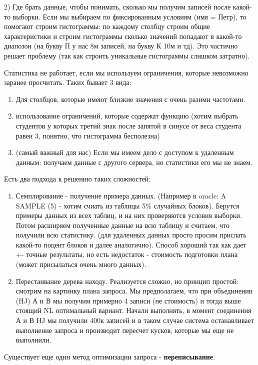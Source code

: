 2) Где брать данные, чтобы понимать, сколько мы получим записей после какой-то выборки. Если мы выбираем по фиксированным условиям (имя = Петр), то помогают строим гистограммы: по каждому столбцу строим общие характеристики и строим гистограммы сколько значений попадают в какой-то диапозон (на букву П у нас 8м записей, на букву К 10м и тд). Это частично решает проблему (так как строить уникальные гистограммы слишком затратно). 

Статистика не работает, если мы используем ограничения, которые невозможно заранее просчитать. Таких бывает 3 вида: 
\begin{enumerate}
	\item Для столбцов, которые имеют близкие значения с очень разнми частотами.
	\item использование ограничений, которые содержат функцию (хотим выбрать студентов у которых третий знак после запятой в синусе от веса студента равен 3, понятно, что гистограмма бесполезна) 
	\item (самый важный для нас) Если мы имеем дело с доступом к удаленным данным: получаем данные с другого сервера, но статистики его мы не знаем.
\end{enumerate}

Есть два подхода к решению таких сложностей: 

\begin{enumerate}
	\item Семплирование - получение примера данных. (Например в oracle: A SAMPLE (5) - хотим счиать из таблицы 5\% случайных блоков). Берутся примеры данных из всех таблиц, и на них проверяются условия выборки. Потом расширяем полученные данные на всю таблицу и считаем, что получили всю статистику. (для удаленных данных просто просим прислать какой-то поцент блоков и далее аналогично). Способ хороший так как дает +- точные результаты, но есть недостаток - стоимость подготовки плана (может присылаться очень много данных).
	\item Перестаивание дерева находу. Реализуется сложно, но принцип простой:  смотрим на картинку плана запроса. Мы предполагаем, что при объединении (HJ) А и В мы получим примерно 4 записи (не стоимость) и тогда выше стоящий NL оптимальный вариант. Начали выполнять, в момент соединения А и В HJ мы получили 400к записей и в таком случае система останавливает выполнение запроса и производит пересчет кусков, которые мы еще не выполнили.
\end{enumerate}

Существует еще один метод оптимизации запроса - \textbf{переписывание}. 

